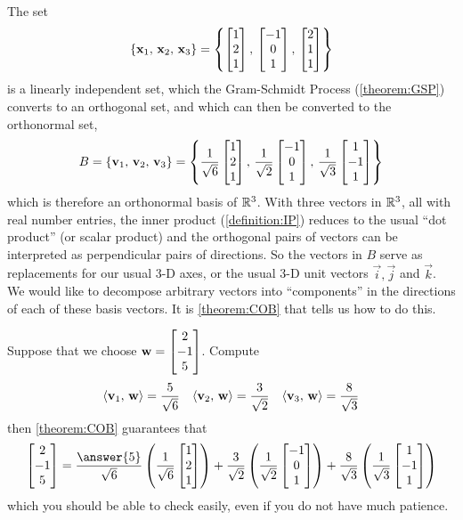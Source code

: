 \documentclass{ximera}
\begin{document}
\begin{example}
  The set
  \[
    \left\{\mathbf{x}_1,\,\mathbf{x}_2,\,\mathbf{x}_3\right\}
    =\left\{
      \begin{bmatrix}1\\2\\1\end{bmatrix},\,
      \begin{bmatrix}-1\\0\\1\end{bmatrix},\,
      \begin{bmatrix}2\\1\\1\end{bmatrix}
    \right\}
  \]
  is a linearly independent set, which the Gram-Schmidt Process
  (\ref{theorem:GSP}) converts to an orthogonal set, and which can
  then be converted to the orthonormal set,
  \[
    B=
    \left\{\mathbf{v}_1,\,\mathbf{v}_2,\,\mathbf{v}_3\right\}
    =\left\{
      \frac{1}{\sqrt{6}}\begin{bmatrix}1\\2\\1\end{bmatrix},\,
      \frac{1}{\sqrt{2}}\begin{bmatrix}-1\\0\\1\end{bmatrix},\,
      \frac{1}{\sqrt{3}}\begin{bmatrix}1\\-1\\1\end{bmatrix}
    \right\}
  \]
  which is therefore an orthonormal basis of $\mathbb{R}^{3}$.  With three
  vectors in $\mathbb{R}^{3}$, all with real number entries, the inner
  product (\ref{definition:IP}) reduces to the usual ``dot product''
  (or scalar product) and the orthogonal pairs of vectors can be
  interpreted as perpendicular pairs of directions.  So the vectors in
  $B$ serve as replacements for our usual 3-D axes, or the usual 3-D
  unit vectors $\vec{i},\vec{j}$ and $\vec{k}$.  We would like to
  decompose arbitrary vectors into ``components'' in the directions of
  each of these basis vectors.  It is \ref{theorem:COB} that tells us
  how to do this.

  Suppose that we choose $\mathbf{w}=\begin{bmatrix}2\\-1\\5\end{bmatrix}$.  Compute
  \begin{align*}
    \left\langle\mathbf{v}_1,\,\mathbf{w}\right\rangle=\frac{5}{\sqrt{6}}&&
                                                             \left\langle\mathbf{v}_2,\,\mathbf{w}\right\rangle=\frac{3}{\sqrt{2}}&&
                                                                                                                      \left\langle\mathbf{v}_3,\,\mathbf{w}\right\rangle=\frac{8}{\sqrt{3}}
  \end{align*}
  then \ref{theorem:COB} guarantees that
  \[
    \colvector{2\\-1\\5}=
    \frac{\answer{5}}{\sqrt{6}}\left(\frac{1}{\sqrt{6}}\colvector{1\\2\\1}\right)+
    \frac{3}{\sqrt{2}}\left(\frac{1}{\sqrt{2}}\colvector{-1\\0\\1}\right)+
    \frac{8}{\sqrt{3}}\left(\frac{1}{\sqrt{3}}\colvector{1\\-1\\1}\right)
  \]
  which you should be able to check easily, even if you do not have much patience.
\end{example}
\end{document}
